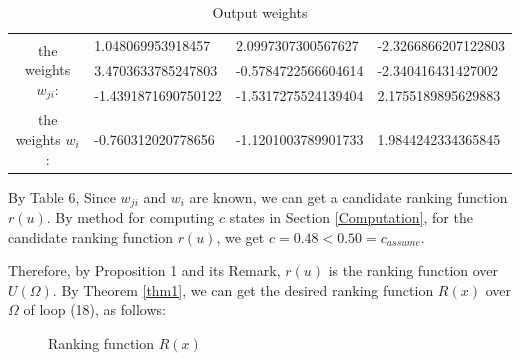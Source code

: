 \begin{exam}
	\begin{table}[H]
		\begin{center}
			\setlength{\abovecaptionskip}{0pt}   
			\setlength{\belowcaptionskip}{0pt}
			\caption{Output weights}
			\begin{tabular}{|c|lll|}
				\hline
				\multirow{3}{*}{the weights $w_{ji}$:} & 1.048069953918457 & 2.0997307300567627   & -2.3266866207122803   \\
				& 3.4703633785247803  & -0.5784722566604614   & -2.340416431427002   \\
				& -1.4391871690750122 & -1.5317275524139404 & 2.1755189895629883 \\
				\hline the weights $w_{i}$:&-0.760312020778656   & -1.1201003789901733 & 1.9844242334365845 \\ \hline
			\end{tabular}
		\end{center}
	\end{table}
	
	By Table 6, Since $w_{ji}$ and $w_i$ are known, we can get a candidate ranking function $r(u)$. By method for computing $c$ states in Section \ref{Computation}, for the candidate ranking function $r(u)$, we get $c = 0.48 < 0.50 = {c_{assume}}$.
	
	Therefore, by Proposition 1 and its Remark, $r(u)$ is the ranking function over $U(\Omega )$. By Theorem \ref{thm1}, we can get the desired ranking function $R(x)$ over $\Omega $ of loop (18), as follows:
	
	\begin{figure}[H] 
		\caption{\label{result2} Ranking function $R(x)$}
	\end{figure}
\end{exam}

